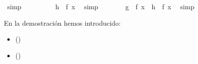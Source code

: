 \begin{isabellebody}
\ simp\isanewline
\ \ \ \ \isamarkupfalse%
\ \isamarkupfalse%
\ {\isachardoublequoteopen}{\isasymdots}\ {\isacharequal}\ {\isacharparenleft}h\ {\isasymcirc}\ f{\isacharparenright}\ x{\isachardoublequoteclose}\ \isamarkupfalse%
\ simp\isanewline
\ \ \ \ \isamarkupfalse%
\ \isamarkupfalse%
\ {\isachardoublequoteopen}{\isacharparenleft}g\ {\isasymcirc}\ f{\isacharparenright}\ x\ {\isacharequal}\ {\isacharparenleft}h\ {\isasymcirc}\ f{\isacharparenright}\ x{\isachardoublequoteclose}\ \isamarkupfalse%
\ simp\isanewline
\ \ \isamarkupfalse%
\isanewline
{}\isamarkupfalse%
%
\endisatagproof
{\isafoldproof}%
%
\isadelimproof
%
\endisadelimproof
%
\begin{isamarkuptext}%
En la demostración hemos introducido: 
 \begin{itemize}
    \item[]  
      \hfill () 
  \end{itemize} 
 \begin{itemize}
    \item[]  
      \hfill ()
  \end{itemize} 


\end{isamarkuptext}
\end{isabellebody}
